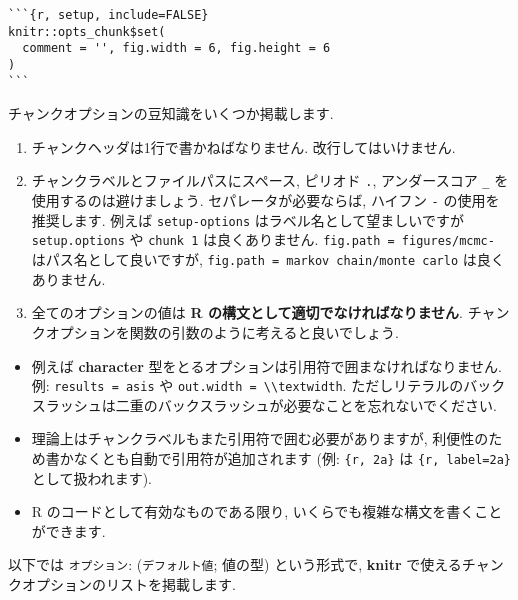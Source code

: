 \documentclass[
  xelatex,ja=standard,jafont=noto]{bxjsreport}
\providecommand{\tightlist}{%
  \setlength{\itemsep}{0pt}\setlength{\parskip}{0pt}}
\begin{document}
\begin{verbatim}
```{r, setup, include=FALSE}
knitr::opts_chunk$set(
  comment = '', fig.width = 6, fig.height = 6
)
```
\end{verbatim}

チャンクオプションの豆知識をいくつか掲載します.

\begin{enumerate}
\def\labelenumi{\arabic{enumi}.}
\tightlist
\item
  チャンクヘッダは1行で書かねばなりません. 改行してはいけません.
\item
  チャンクラベルとファイルパスにスペース, ピリオド \texttt{.},
  アンダースコア \texttt{\_} を使用するのは避けましょう.
  セパレータが必要ならば, ハイフン \texttt{-} の使用を推奨します. 例えば
  \texttt{setup-options} はラベル名として望ましいですが
  \texttt{setup.options} や \texttt{chunk\ 1} は良くありません.
  \texttt{fig.path\ =\ \textquotesingle{}figures/mcmc-\textquotesingle{}}
  はパス名として良いですが,
  \texttt{fig.path\ =\ \textquotesingle{}markov\ chain/monte\ carlo\textquotesingle{}}
  は良くありません.
\item
  全てのオプションの値は \textbf{R
  の構文として適切でなければなりません}.
  チャンクオプションを関数の引数のように考えると良いでしょう.
\end{enumerate}

\begin{itemize}
\tightlist
\item
  例えば \textbf{character}
  型をとるオプションは引用符で囲まなければなりません. 例:
  \texttt{results\ =\ \textquotesingle{}asis\textquotesingle{}} や
  \texttt{out.width\ =\ \textquotesingle{}\textbackslash{}\textbackslash{}textwidth\textquotesingle{}}.
  ただしリテラルのバックスラッシュは二重のバックスラッシュが必要なことを忘れないでください.
\item
  理論上はチャンクラベルもまた引用符で囲む必要がありますが,
  利便性のため書かなくとも自動で引用符が追加されます (例:
  \texttt{\textasciigrave{}\textasciigrave{}\textasciigrave{}\{r,\ 2a\}\textasciigrave{}\textasciigrave{}\textasciigrave{}}
  は
  \texttt{\textasciigrave{}\textasciigrave{}\textasciigrave{}\{r,\ label=\textquotesingle{}2a\textquotesingle{}\}\textasciigrave{}\textasciigrave{}\textasciigrave{}}
  として扱われます).
\item
  R のコードとして有効なものである限り,
  いくらでも複雑な構文を書くことができます.
\end{itemize}

以下では \texttt{オプション}: (\texttt{デフォルト値}; 値の型)
という形式で, \textbf{knitr}
で使えるチャンクオプションのリストを掲載します.
\end{document}
